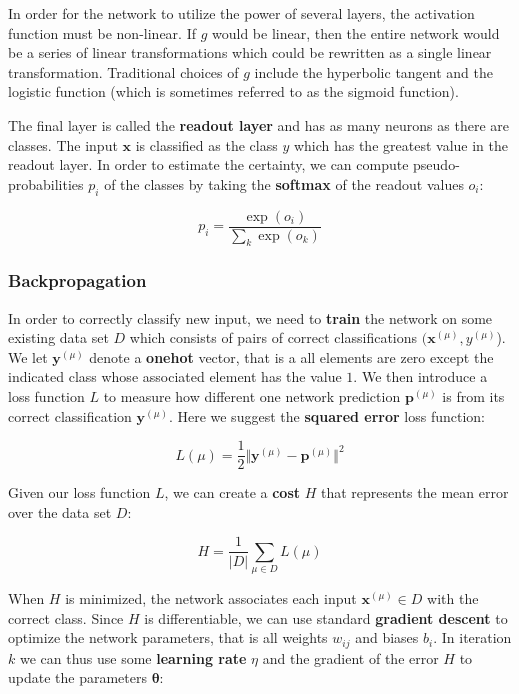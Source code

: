 In order for the network to utilize the power of several layers, the activation function must be non-linear. If $g$ would be linear, then the entire network would be a series of linear transformations which could be rewritten as a single linear transformation. Traditional choices of $g$ include the hyperbolic tangent and the logistic function (which is sometimes referred to as the sigmoid function).

The final layer is called the \textbf{readout layer} and has as many neurons as there are classes. The input $\mathbf{x}$ is classified as the class $y$ which has the greatest value in the readout layer. In order to estimate the certainty, we can compute pseudo-probabilities $p_i$ of the classes by taking the \textbf{softmax} of the readout values $o_i$:

\[
p_i = \frac{ \exp(o_i) }{ \sum_k \exp(o_k) }
\]

\subsubsection{Backpropagation} \label{sssec:BackProp}

In order to correctly classify new input, we need to \textbf{train} the network on some existing data set $D$ which consists of pairs of correct classifications $(\mathbf{x}^{(\mu)}, y^{(\mu)}$).
We let $\mathbf{y}^{(\mu)}$ denote a \textbf{onehot} vector, that is a all elements are zero except the indicated class whose associated element has the value $1$.
We then introduce a loss function $L$ to measure how different one network prediction $\mathbf{p}^{(\mu)}$ is from its correct classification $\mathbf{y}^{(\mu)}$. Here we suggest the \textbf{squared error} loss function:

\[
L(\mu) = \frac{1}{2} \Vert
  \mathbf{y}^{(\mu)} - \mathbf{p}^{(\mu)}
\Vert ^2
\]

Given our loss function $L$, we can create a \textbf{cost} $H$ that represents the mean error over the data set $D$:

\[
H = \frac{1}{\vert D \vert} \sum_{\mu \in D} L(\mu)
\]

When $H$ is minimized, the network associates each input $\mathbf{x}^{(\mu)} \in D$ with the correct class. Since $H$ is differentiable, we can use standard \textbf{gradient descent} to optimize the network parameters, that is all weights $w_{ij}$ and biases $b_i$.
In iteration $k$ we can thus use some \textbf{learning rate} $\eta$ and the gradient of the error $H$ to update the parameters $\mathbf{\theta}$:

